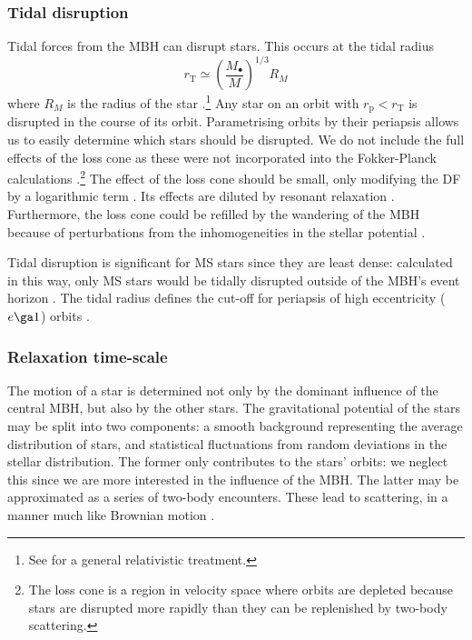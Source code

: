 \documentclass[useAMS,usedcolumn,usegraphicx,usenatbib]{mn2e}
\newcommand{\sub}[1]{\ensuremath{_\mathrm{#1}}}
\begin{document}
\subsubsection{Tidal disruption}

Tidal forces from the MBH can disrupt stars. This occurs at the tidal radius
\begin{equation}
r\sub{T} \simeq \left(\frac{M_\bullet}{M}\right)^{1/3}R_M
\label{eq:Tidal}
\end{equation}
where $R_M$ is the radius of the star \citep{Hills1975, Rees1988, Kobayashi2004}.\footnote{See \citet{Kesden2012} for a general relativistic treatment.} Any star on an orbit with $r\sub{p} < r\sub{T}$ is disrupted in the course of its orbit. Parametrising orbits by their periapsis allows us to easily determine which stars should be disrupted. We do not include the full effects of the loss cone \citep{Frank1976, Lightman1977, Cohn1978} as these were not incorporated into the Fokker-Planck calculations \citep{Hopman2009}.\footnote{The loss cone is a region in velocity space where orbits are depleted because stars are disrupted more rapidly than they can be replenished by two-body scattering.} The effect of the loss cone should be small, only modifying the DF by a logarithmic term \citep{Lightman1977, Bahcall1977, Cohn1978}. Its effects are diluted by resonant relaxation \citep{Hopman2007,Toonen2009,Merritt2011}. Furthermore, the loss cone could be refilled by the wandering of the MBH because of perturbations from the inhomogeneities in the stellar potential \citep{Sigurdsson1997,Chatterjee2002,Merritt2007}.

Tidal disruption is significant for MS stars since they are least dense: calculated in this way, only MS stars would be tidally disrupted outside of the MBH's event horizon \citep{Sigurdsson1997}. The tidal radius defines the cut-off for periapsis of high eccentricity ($e \ga 1$) orbits \citep{Lightman1977}.

\subsubsection{Relaxation time-scale}\label{sec:Relax}

The motion of a star is determined not only by the dominant influence of the central MBH, but also by the other stars. The gravitational potential of the stars may be split into two components: a smooth background representing the average distribution of stars, and statistical fluctuations from random deviations in the stellar distribution. The former only contributes to the stars' orbits: we neglect this since we are more interested in the influence of the MBH. The latter may be approximated as a series of two-body encounters. These lead to scattering, in a manner much like Brownian motion \citep{Bekenstein1992,Maoz1993,Nelson1999}.
\end{document}

